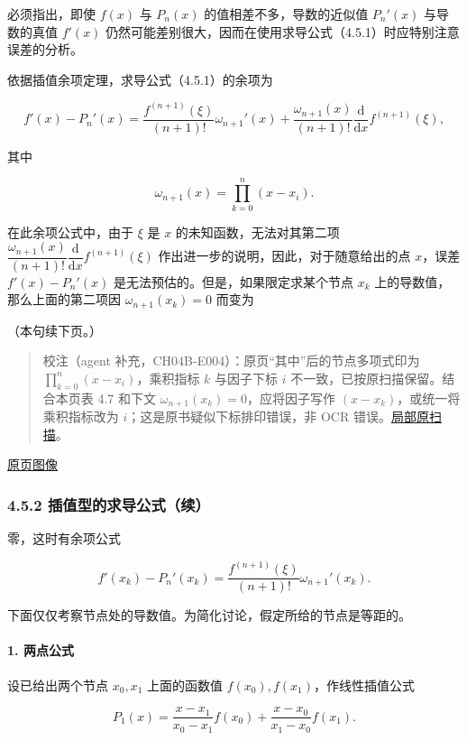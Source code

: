 \documentclass[
  10pt,
  fontset=fandol]{ctexart}
\begin{document}
必须指出，即使 \(f(x)\) 与 \(P_n(x)\) 的值相差不多，导数的近似值 \(P_n'(x)\) 与导数的真值 \(f'(x)\) 仍然可能差别很大，因而在使用求导公式（4.5.1）时应特别注意误差的分析。

依据插值余项定理，求导公式（4.5.1）的余项为

\[
f'(x)-P_n'(x)=\frac{f^{(n+1)}(\xi)}{(n+1)!}\omega_{n+1}'(x)
+\frac{\omega_{n+1}(x)}{(n+1)!}\frac{\mathrm{d}}{\mathrm{d}x}f^{(n+1)}(\xi),
\]

其中

\[
\omega_{n+1}(x)=\prod_{k=0}^{n}(x-x_i).
\]

在此余项公式中，由于 \(\xi\) 是 \(x\) 的未知函数，无法对其第二项 \(\dfrac{\omega_{n+1}(x)}{(n+1)!}\dfrac{\mathrm{d}}{\mathrm{d}x}f^{(n+1)}(\xi)\) 作出进一步的说明，因此，对于随意给出的点 \(x\)，误差 \(f'(x)-P_n'(x)\) 是无法预估的。但是，如果限定求某个节点 \(x_k\) 上的导数值，那么上面的第二项因 \(\omega_{n+1}(x_k)=0\) 而变为

（本句续下页。）

\begin{quote}
校注（agent 补充，CH04B-E004）：原页``其中''后的节点多项式印为 \(\prod_{k=0}^{n}(x-x_i)\)，乘积指标 \(k\) 与因子下标 \(i\) 不一致，已按原扫描保留。结合本页表 4.7 和下文 \(\omega_{n+1}(x_k)=0\)，应将因子写作 \((x-x_k)\)，或统一将乘积指标改为 \(i\)；这是原书疑似下标排印错误，非 OCR 错误。\href{../assets/ch04b/review-p113-product.png}{局部原扫描}。
\end{quote}

\href{../../source-images/pdf-114.jpeg}{原页图像}

\subsubsection{4.5.2 插值型的求导公式（续）}\label{ux63d2ux503cux578bux7684ux6c42ux5bfcux516cux5f0fux7eed}

零，这时有余项公式

\[
f'(x_k)-P_n'(x_k)=\frac{f^{(n+1)}(\xi)}{(n+1)!}\omega_{n+1}'(x_k).
\tag{4.5.2}
\]

下面仅仅考察节点处的导数值。为简化讨论，假定所给的节点是等距的。

\paragraph{1. 两点公式}\label{ux4e24ux70b9ux516cux5f0f}

设已给出两个节点 \(x_0,x_1\) 上面的函数值 \(f(x_0),f(x_1)\)，作线性插值公式

\[
P_1(x)=\frac{x-x_1}{x_0-x_1}f(x_0)+\frac{x-x_0}{x_1-x_0}f(x_1).
\]
\end{document}

